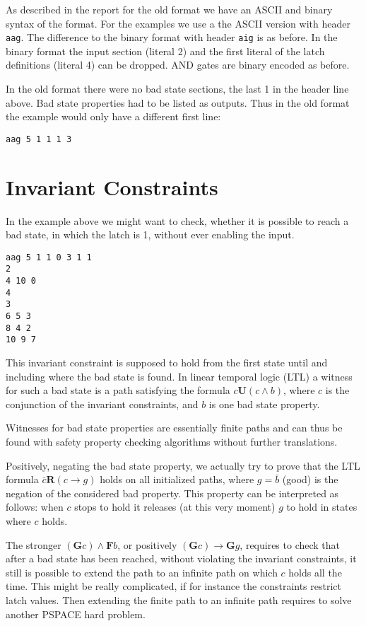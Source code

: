 \documentclass{llncs}
\begin{document}
As described in the report for the old format we have an ASCII and binary
syntax of the format.
For the examples we use a the ASCII
version with header \texttt{aag}.  The difference to the binary format
with header \texttt{aig} is as before.  In the binary format
the input section (literal 2) and the first literal of the latch definitions
(literal 4) can be dropped.  AND gates are binary encoded as before.

In the old format there were no bad state sections, the last 1 in the header
line above.  Bad state properties had to be listed as outputs.  Thus in the old
format the example would only have a different first line: {\small
\begin{verbatim}
aag 5 1 1 1 3
\end{verbatim}}

\section{Invariant Constraints}

In the example above we might want to check, whether it is possible to reach
a bad state, in which the latch is 1, without ever enabling the input.
{\small
\begin{verbatim}
aag 5 1 1 0 3 1 1
2
4 10 0
4
3
6 5 3
8 4 2
10 9 7
\end{verbatim}}
This invariant constraint is supposed to hold from the first state
until and including where the bad state is found.  In linear temporal logic
(LTL) a witness for such a bad state is a path satisfying the formula
$\mathit{c} \mathrel{\mathbf{U}} (c \wedge b)$,
where $c$ is the conjunction of the invariant constraints, and $b$ is
one bad state property.  

Witnesses for bad state properties are essentially finite paths
and can thus be found with safety property checking algorithms without
further translations.

Positively, negating the bad state property, we actually try to prove that
the LTL formula $ \mathit{\bar c} \mathrel{\mathbf{R}} (c \to g) $ holds on
all initialized paths, where $g = \bar b$ (good) is the negation of the
considered bad property.  This property can be interpreted as follows: when
$c$ stops to hold it releases (at this very moment) $g$ to hold in states
where $c$ holds.

The stronger ${(\mathrel{\mathbf{G}} c)} \wedge {\mathrel{\mathbf{F}}b}$,
or positively ${(\mathrel{\mathbf{G}} c)} \to {\mathrel{\mathbf{G}}g}$,
requires to check that after a bad state has been
reached, without violating the invariant constraints, it still is possible
to extend the path to an infinite path on which $c$ holds all the time.
This might be really complicated, if for instance the constraints restrict
latch values.  Then extending the finite path to an infinite path requires
to solve another PSPACE hard problem.
\end{document}
